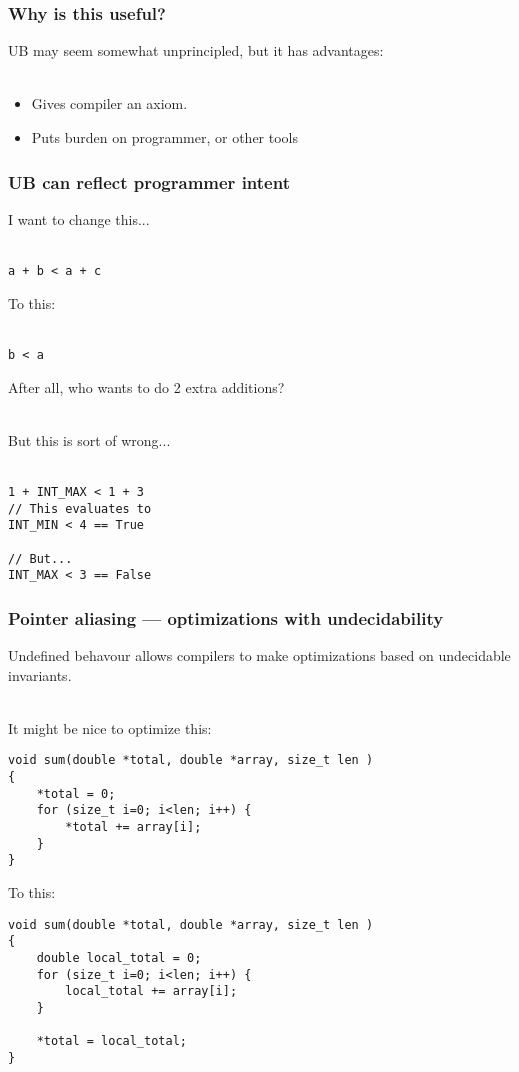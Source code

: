 \documentclass{beamer}
\begin{document}
\begin{frame}
  \frametitle{Why is this useful?}

  UB may seem somewhat unprincipled, but it has advantages:\\~

  \begin{itemize}
  \item Gives compiler an axiom.
  \item Puts burden on programmer, or other tools
  \end{itemize}

\end{frame}

\begin{frame}
  \frametitle{UB can reflect programmer intent}

  I want to change this...\\~

\begin{lstlisting}
a + b < a + c
\end{lstlisting}

  \pause

  To this:\\~

\begin{lstlisting}
b < a
\end{lstlisting}

  After all, who wants to do 2 extra additions?\\~

  \pause

  But this is sort of wrong...\\~

\begin{lstlisting}
1 + INT_MAX < 1 + 3
// This evaluates to
INT_MIN < 4 == True

// But...
INT_MAX < 3 == False
\end{lstlisting}
\end{frame}

\begin{frame}[fragile]
  \frametitle{Pointer aliasing --- optimizations with undecidability}

  Undefined behavour allows compilers to make optimizations based on
  undecidable invariants.\\~

  \pause

  It might be nice to optimize this:

\begin{lstlisting}
void sum(double *total, double *array, size_t len )
{
    *total = 0;
    for (size_t i=0; i<len; i++) {
        *total += array[i];
    }
}
\end{lstlisting}

  To this:

\begin{lstlisting}
void sum(double *total, double *array, size_t len )
{
    double local_total = 0;
    for (size_t i=0; i<len; i++) {
        local_total += array[i];
    }

    *total = local_total;
}
\end{lstlisting}

\end{frame}
\end{document}
